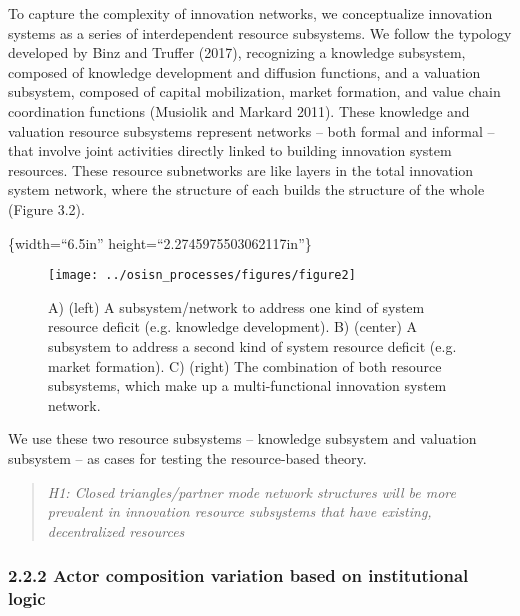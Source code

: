 \documentclass[twoside,12pt,final]{ucthesis-CA2012}
\begin{document}
\begin{ucmainmatter}
To capture the complexity of innovation networks, we conceptualize
innovation systems as a series of interdependent \textquotesingle resource
subsystems.\textquotesingle{} We follow the typology developed by Binz and Truffer
(2017), recognizing a knowledge subsystem, composed of knowledge
development and diffusion functions, and a valuation subsystem, composed
of capital mobilization, market formation, and value chain coordination
functions (Musiolik and Markard 2011). These knowledge and valuation
resource subsystems represent networks -- both formal and informal --
that involve joint activities directly linked to building innovation
system resources. These resource subnetworks are like layers in the
total innovation system network, where the structure of each builds the
structure of the whole (Figure 3.2).

\{width=``6.5in'' height=``2.2745975503062117in''\}
\begin{figure}

{\centering \texttt{[image: ../osisn\_processes/figures/figure2]} 

}

\caption{A) (left) A subsystem/network to address one kind of system resource deficit (e.g. knowledge development). B) (center) A subsystem to address a second kind of system resource deficit (e.g. market formation). C) (right) The combination of both resource subsystems, which make up a multi-functional innovation system network.}\label{fig:unnamed-chunk-15}
\end{figure}
We use these two resource subsystems -- knowledge subsystem and
valuation subsystem -- as cases for testing the resource-based theory.
\begin{quote}
\emph{H1: Closed triangles/partner mode network structures will be more
prevalent in innovation resource subsystems that have existing,
decentralized resources}
\end{quote}
\hypertarget{actor-composition-variation-based-on-institutional-logic}{%
\subsubsection{2.2.2 Actor composition variation based on institutional logic}\label{actor-composition-variation-based-on-institutional-logic}}


\end{ucmainmatter}
\end{document}

